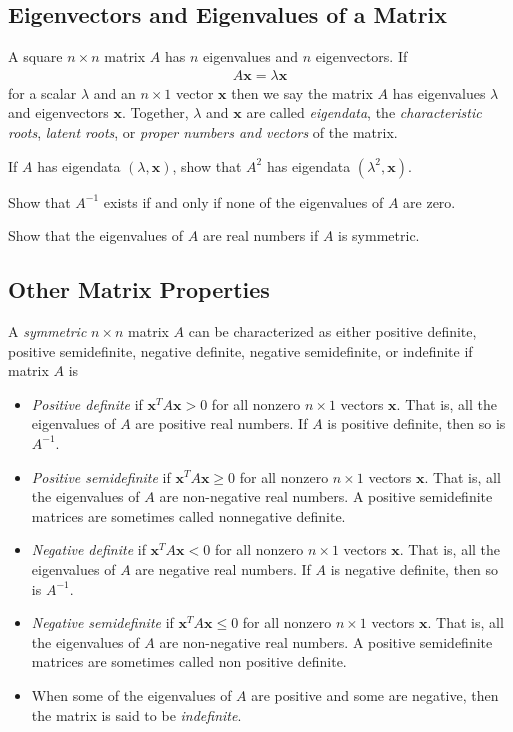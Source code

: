 \subsection{Eigenvectors and Eigenvalues of a Matrix}

A square $n\times n$ matrix $A$ has $n$ eigenvalues and $n$ eigenvectors. If 
%
\begin{align}
	A \bm{x} = \lambda \bm{x}
\end{align}
%
for a scalar $\lambda$ and an $n \times 1$  vector $\bm{x}$ then we say the matrix $A$ has eigenvalues $\lambda$ and eigenvectors $\bm{x}$. Together, $\lambda$ and $\bm{x}$ are called \textit{eigendata}, the \textit{characteristic roots}, \textit{latent roots}, or \textit{proper numbers and vectors} of the matrix.

\begin{homework}
	If $A$ has eigendata $\left(\lambda, \bm{x}\right)$, show that $A^2$ has eigendata $\left(\lambda^2, \bm{x}\right)$. 
\end{homework}
%
\begin{homework}
	Show that $A^{-1}$ exists if and only if none of the eigenvalues of $A$ are zero.
\end{homework}
%
\begin{homework}
	Show that the eigenvalues of $A$ are real numbers if $A$ is symmetric.
\end{homework}

\subsection{Other Matrix Properties}
%
A \textit{symmetric} $n \times n$ matrix $A$ can be characterized as either positive definite, positive semidefinite, negative definite, negative semidefinite, or indefinite if matrix $A$ is
%
\begin{itemize}
	\item \textit{Positive definite} if $\bm{x}^TA\bm{x}>0$ for all nonzero $n \times 1$ vectors $\bm{x}$. That is, all the eigenvalues of $A$ are positive real numbers.  If $A$ is positive definite, then so is $A^{-1}$.
	\item \textit{Positive semidefinite} if $\bm{x}^TA\bm{x} \ge 0$ for all nonzero $n \times 1$ vectors $\bm{x}$. That is, all the eigenvalues of $A$ are non-negative real numbers. A positive semidefinite matrices are sometimes called nonnegative definite.
	\item \textit{Negative definite} if $\bm{x}^TA\bm{x} < 0$ for all nonzero $n \times 1$ vectors $\bm{x}$. That is, all the eigenvalues of $A$ are negative real numbers.  If $A$ is negative definite, then so is $A^{-1}$.
	\item \textit{Negative semidefinite} if $\bm{x}^TA\bm{x} \le 0$ for all nonzero $n \times 1$ vectors $\bm{x}$. That is, all the eigenvalues of $A$ are non-negative real numbers. A positive semidefinite matrices are sometimes called non positive definite.
	\item When some of the eigenvalues of $A$ are positive and some are negative, then the matrix is said to be \textit{indefinite}.
\end{itemize}

